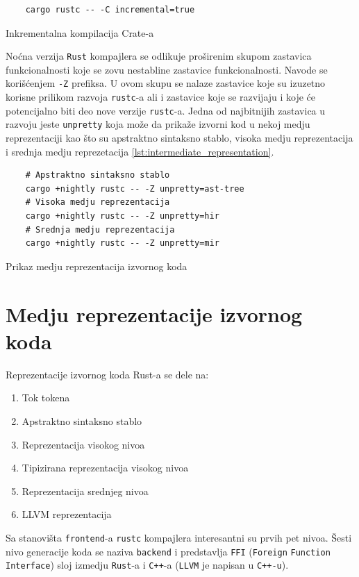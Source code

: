 \documentclass[11pt]{article}
\begin{document}
\begin{listing}[H]
\begin{verbatim}
    cargo rustc -- -C incremental=true 
\end{verbatim}
\caption{Inkrementalna kompilacija Crate-a}
\label{lst:incremental_flag}
\end{listing}


Noćna verzija \verb|Rust| kompajlera se odlikuje proširenim skupom zastavica funkcionalnosti koje se zovu 
nestabline zastavice funkcionalnosti. Navode se korišćenjem \verb|-Z| prefiksa. U ovom skupu se nalaze 
zastavice koje su izuzetno korisne prilikom razvoja \verb|rustc|-a ali i zastavice koje se razvijaju
i koje će potencijalno biti deo nove verzije \verb|rustc|-a. Jedna od najbitnijih zastavica u razvoju 
jeste \verb|unpretty| koja može da prikaže izvorni kod u nekoj medju reprezentaciji kao što su
apstraktno sintaksno stablo, visoka medju reprezentacija i srednja medju reprezetacija \ref{lst:intermediate_representation}.

\begin{listing}[H]
\begin{verbatim}
    # Apstraktno sintaksno stablo 
    cargo +nightly rustc -- -Z unpretty=ast-tree
    # Visoka medju reprezentacija
    cargo +nightly rustc -- -Z unpretty=hir
    # Srednja medju reprezentacija
    cargo +nightly rustc -- -Z unpretty=mir
\end{verbatim}
\caption{Prikaz medju reprezentacija izvornog koda}
\label{lst:intermediate_representation}
\end{listing}


\newpage



\section{Medju reprezentacije izvornog koda}

Reprezentacije izvornog koda Rust-a se dele na:

\begin{enumerate}    
    \item Tok tokena
    \item Apstraktno sintaksno stablo
    \item Reprezentacija visokog nivoa
    \item Tipizirana reprezentacija visokog nivoa
    \item Reprezentacija srednjeg nivoa
    \item LLVM reprezentacija
\end{enumerate}
Sa stanovišta \verb|frontend|-a \verb|rustc| kompajlera interesantni su prvih pet nivoa. Šesti nivo generacije 
koda se naziva \verb|backend| i predstavlja \verb|FFI| (\verb|Foreign| \verb|Function| \verb|Interface|) sloj izmedju \verb|Rust|-a i \verb|C++|-a
(\verb|LLVM| je napisan u \verb|C++-u|). 
\end{document}

